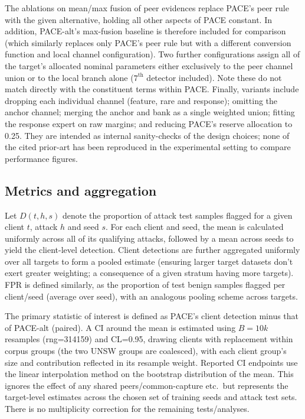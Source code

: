 The ablations on mean/max fusion of peer evidences replace PACE's peer rule with the given alternative, holding all other aspects of PACE constant. In addition, PACE-alt's max-fusion baseline is therefore included for comparison (which similarly replaces only PACE's peer rule but with a different conversion function and local channel configuration). Two further configurations assign all of the target's allocated nominal parameters either exclusively to the peer channel union or to the local branch alone ($7^{\text{th}}$ detector included). Note these do not match directly with the constituent terms within PACE. Finally, variants include dropping each individual channel (feature, rare and response); omitting the anchor channel; merging the anchor and bank as a single weighted union; fitting the response expert on raw margins; and reducing PACE's reserve allocation to 0.25. They are intended as internal sanity-checks of the design choices; none of the cited prior-art has been reproduced in the experimental setting to compare performance figures.

\subsection{Metrics and aggregation} 
Let $D(t,h,s)$ denote the proportion of attack test samples flagged for a given client $t$, attack $h$ and seed $s$. For each client and seed, the mean is calculated uniformly across all of its qualifying attacks, followed by a mean across seeds to yield the client-level detection. Client detections are further aggregated uniformly over all targets to form a pooled estimate (ensuring larger target datasets don't exert greater weighting; a consequence of a given stratum having more targets). FPR is defined similarly, as the proportion of test benign samples flagged per client/seed (average over seed), with an analogous pooling scheme across targets.

The primary statistic of interest is defined as PACE's client detection minus that of PACE-alt (paired). A CI around the mean is estimated using $B=10k$ resamples (rng=314159) and CL=0.95, drawing clients with replacement within corpus groups (the two UNSW groups are coalesced), with each client group's size and contribution reflected in its resample weight. Reported CI endpoints use the linear interpolation method on the bootstrap distribution of the mean. This ignores the effect of any shared peers/common-capture etc.\ but represents the target-level estimates across the chosen set of training seeds and attack test sets. There is no multiplicity correction for the remaining tests/analyses.

